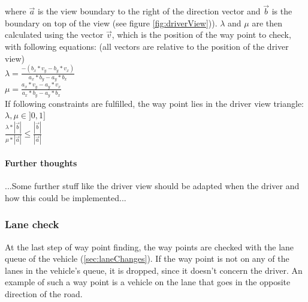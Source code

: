 \noindent where $\vec{a}$ is the view boundary to the right of the direction 
vector and $\vec{b}$ is the boundary on top of the view (see figure 
\ref{fig:driverView})). $\lambda$ and $\mu$ are then calculated using the 
vector $\vec{v}$, which is the position of the way point to check, with following
equations: (all vectors are relative to the position of the driver view) \\

$ \lambda = \frac{-(b_x*v_y - b_y * v_x)}{a_x * b_y - a_y * b_x}$\\

$\mu = \frac{a_x * v_y - a_y * v_x}{a_x * b_y - a_y * b_x} $ \\

\noindent If following constraints are fulfilled, the way point lies in the driver
view triangle: \\

$ \lambda, \mu \in ]0, 1]$ \\

$ \frac{\lambda * \left| \vec{b} \right| }{\mu * \left| \vec{a} \right|} \leq 
\frac{\left| \vec{b} \right|}{\left| \vec{a} \right|}$

\paragraph{Further thoughts}
...Some further stuff like the driver view should be adapted when the driver
and how this could be implemented...


\subsubsection{Lane check}

At the last step of way point finding, the way points are checked with the
lane queue of the vehicle (\ref{sec:laneChanges}). If the way point is not
on any of the lanes in the vehicle's queue, it is dropped, since it doesn't
concern the driver. An example of such a way point is a vehicle on the lane
that goes in the opposite direction of the road.


